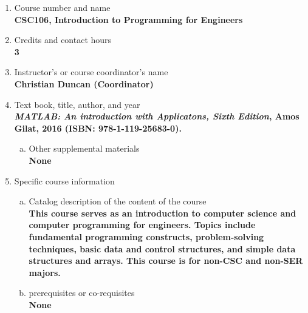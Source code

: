 \label{CSC106}  %
\begin{enumerate}[1.]
\item Course number and name\\
  {\bfseries
    CSC106, Introduction to Programming for Engineers
  }
  
\item Credits and contact hours\\
  {\bfseries
    3  %
  }

\item Instructor's or course coordinator's name\\
  {\bfseries
    Christian Duncan (Coordinator)    
  }

\item Text book, title, author, and year\\
  {\bfseries
    \emph{MATLAB: An introduction with Applicatons, Sixth Edition}, Amos Gilat, 2016 (ISBN: 978-1-119-25683-0).    
  }
\begin{enumerate}[a.]
\item Other supplemental materials\\
  {\bfseries
    None    
  }
\end{enumerate}

\item Specific course information
\begin{enumerate}[a.]  
\item Catalog description of the content of the course\\
  {\bfseries
This course serves as an introduction to computer science and computer programming for engineers. Topics include fundamental programming constructs, problem-solving techniques, basic data and control structures, and simple data structures and arrays. This course is for non-CSC and non-SER majors.
  }

\item prerequisites or co-requisites\\
  {\bfseries
    None   %
  }


\end{enumerate}
\end{enumerate}
